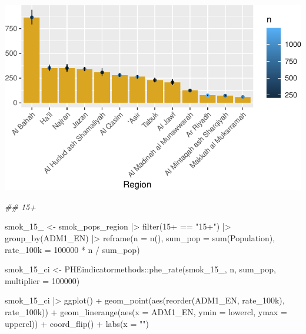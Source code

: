 \documentclass[
  letterpaper,
  DIV=11,
  numbers=noendperiod]{scrreprt}
\newenvironment{Shaded}{\begin{snugshade}}{\end{snugshade}}
\newcommand{\AttributeTok}[1]{\textcolor[rgb]{0.40,0.45,0.13}{#1}}
\newcommand{\DecValTok}[1]{\textcolor[rgb]{0.68,0.00,0.00}{#1}}
\newcommand{\DocumentationTok}[1]{\textcolor[rgb]{0.37,0.37,0.37}{\textit{#1}}}
\newcommand{\FunctionTok}[1]{\textcolor[rgb]{0.28,0.35,0.67}{#1}}
\newcommand{\NormalTok}[1]{\textcolor[rgb]{0.00,0.23,0.31}{#1}}
\newcommand{\OtherTok}[1]{\textcolor[rgb]{0.00,0.23,0.31}{#1}}
\newcommand{\SpecialCharTok}[1]{\textcolor[rgb]{0.37,0.37,0.37}{#1}}
\newcommand{\StringTok}[1]{\textcolor[rgb]{0.13,0.47,0.30}{#1}}
\begin{document}
\includegraphics{lookups_files/figure-pdf/calculate smoking rates by region-1.pdf}

\begin{Shaded}
\begin{Highlighting}[]
\DocumentationTok{\#\# 15+}

\NormalTok{smok\_15\_ }\OtherTok{\textless{}{-}}\NormalTok{ smok\_pops\_region }\SpecialCharTok{|\textgreater{}}
    \FunctionTok{filter}\NormalTok{(}\StringTok{\textasciigrave{}}\AttributeTok{15+}\StringTok{\textasciigrave{}} \SpecialCharTok{==} \StringTok{"15+"}\NormalTok{) }\SpecialCharTok{|\textgreater{}}
    \FunctionTok{group\_by}\NormalTok{(ADM1\_EN) }\SpecialCharTok{|\textgreater{}}
    \FunctionTok{reframe}\NormalTok{(}\AttributeTok{n =} \FunctionTok{n}\NormalTok{(), }
            \AttributeTok{sum\_pop =} \FunctionTok{sum}\NormalTok{(Population), }
            \AttributeTok{rate\_100k =} \DecValTok{100000} \SpecialCharTok{*}\NormalTok{ n }\SpecialCharTok{/}\NormalTok{ sum\_pop)}

\NormalTok{smok\_15\_ci }\OtherTok{\textless{}{-}}\NormalTok{ PHEindicatormethods}\SpecialCharTok{::}\FunctionTok{phe\_rate}\NormalTok{(smok\_15\_, n, sum\_pop,  }\AttributeTok{multiplier =} \DecValTok{100000}\NormalTok{)}

\NormalTok{smok\_15\_ci }\SpecialCharTok{|\textgreater{}}
    \FunctionTok{ggplot}\NormalTok{() }\SpecialCharTok{+}
    \FunctionTok{geom\_point}\NormalTok{(}\FunctionTok{aes}\NormalTok{(}\FunctionTok{reorder}\NormalTok{(ADM1\_EN, rate\_100k), rate\_100k)) }\SpecialCharTok{+}
    \FunctionTok{geom\_linerange}\NormalTok{(}\FunctionTok{aes}\NormalTok{(}\AttributeTok{x =}\NormalTok{ ADM1\_EN, }\AttributeTok{ymin =}\NormalTok{ lowercl, }\AttributeTok{ymax =}\NormalTok{ uppercl)) }\SpecialCharTok{+}
    \FunctionTok{coord\_flip}\NormalTok{() }\SpecialCharTok{+}
    \FunctionTok{labs}\NormalTok{(}\AttributeTok{x =} \StringTok{""}\NormalTok{)}
\end{Highlighting}
\end{Shaded}
\end{document}
